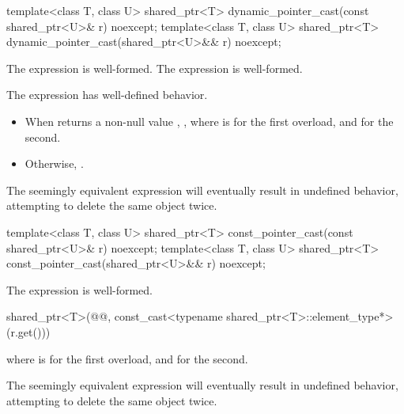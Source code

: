 %
\begin{itemdecl}
template<class T, class U>
  shared_ptr<T> dynamic_pointer_cast(const shared_ptr<U>& r) noexcept;
template<class T, class U>
  shared_ptr<T> dynamic_pointer_cast(shared_ptr<U>&& r) noexcept;
\end{itemdecl}

\begin{itemdescr}
\pnum
\mandates
The expression  is well-formed.
The expression  is well-formed.

\pnum
\expects
The expression  has well-defined behavior.

\pnum
\returns
\begin{itemize}
\item When 
  returns a non-null value ,
  ,
  where  is  for the first overload, and
   for the second.
\item Otherwise, .
\end{itemize}

\pnum
\begin{note}
The seemingly equivalent expression
 will eventually result in
undefined behavior, attempting to delete the same object twice.
\end{note}
\end{itemdescr}

%
\begin{itemdecl}
template<class T, class U>
  shared_ptr<T> const_pointer_cast(const shared_ptr<U>& r) noexcept;
template<class T, class U>
  shared_ptr<T> const_pointer_cast(shared_ptr<U>&& r) noexcept;
\end{itemdecl}

\begin{itemdescr}
\pnum
\mandates
The expression  is well-formed.

\pnum
\returns
\begin{codeblock}
shared_ptr<T>(@@, const_cast<typename shared_ptr<T>::element_type*>(r.get()))
\end{codeblock}
where  is  for the first overload, and
 for the second.

\pnum
\begin{note}
The seemingly equivalent expression
 will eventually result in
undefined behavior, attempting to delete the same object twice.
\end{note}
\end{itemdescr}

